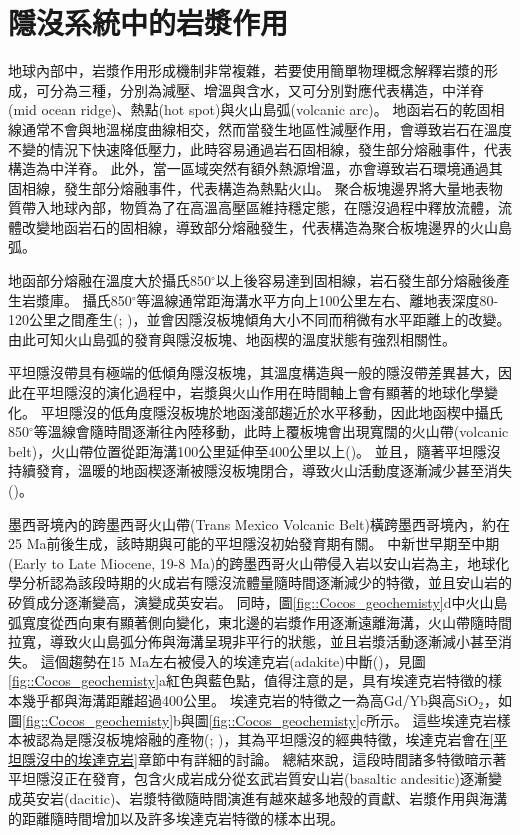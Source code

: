 \section{隱沒系統中的岩漿作用}\label{隱沒系統中的岩漿作用}
地球內部中，岩漿作用形成機制非常複雜，若要使用簡單物理概念解釋岩漿的形成，可分為三種，分別為減壓、增溫與含水，又可分別對應代表構造，中洋脊(mid ocean ridge)、熱點(hot spot)與火山島弧(volcanic arc)。
地函岩石的乾固相線通常不會與地溫梯度曲線相交，然而當發生地區性減壓作用，會導致岩石在溫度不變的情況下快速降低壓力，此時容易通過岩石固相線，發生部分熔融事件，代表構造為中洋脊。
此外，當一區域突然有額外熱源增溫，亦會導致岩石環境通過其固相線，發生部分熔融事件，代表構造為熱點火山。
聚合板塊邊界將大量地表物質帶入地球內部，物質為了在高溫高壓區維持穩定態，在隱沒過程中釋放流體，流體改變地函岩石的固相線，導致部分熔融發生，代表構造為聚合板塊邊界的火山島弧。

地函部分熔融在溫度大於攝氏850$^{\circ}$以上後容易達到固相線，岩石發生部分熔融後產生岩漿庫。
攝氏850$^{\circ}$等溫線通常距海溝水平方向上100公里左右、離地表深度80-120公里之間產生(\citealp{peacock1990fluid}; \citealp{hyndman2003serpentinization})，並會因隱沒板塊傾角大小不同而稍微有水平距離上的改變。
由此可知火山島弧的發育與隱沒板塊、地函楔的溫度狀態有強烈相關性。

平坦隱沒帶具有極端的低傾角隱沒板塊，其溫度構造與一般的隱沒帶差異甚大，因此在平坦隱沒的演化過程中，岩漿與火山作用在時間軸上會有顯著的地球化學變化。
平坦隱沒的低角度隱沒板塊於地函淺部趨近於水平移動，因此地函楔中攝氏850$^{\circ}$等溫線會隨時間逐漸往內陸移動，此時上覆板塊會出現寬闊的火山帶(volcanic belt)，火山帶位置從距海溝100公里延伸至400公里以上(\citealp{Gutscher2000A})。
並且，隨著平坦隱沒持續發育，溫暖的地函楔逐漸被隱沒板塊閉合，導致火山活動度逐漸減少甚至消失(\citealp{Gutscher2000Bcan})。

墨西哥境內的跨墨西哥火山帶(Trans Mexico Volcanic Belt)橫跨墨西哥境內，約在25 Ma前後生成，該時期與可能的平坦隱沒初始發育期有關。
中新世早期至中期(Early to Late Miocene, 19-8 Ma)的跨墨西哥火山帶侵入岩以安山岩為主，地球化學分析認為該段時期的火成岩有隱沒流體量隨時間逐漸減少的特徵，並且安山岩的矽質成分逐漸變高，演變成英安岩。
同時，圖\ref{fig::Cocos_geochemisty}d中火山島弧寬度從西向東有顯著側向變化，東北邊的岩漿作用逐漸遠離海溝，火山帶隨時間拉寬，導致火山島弧分佈與海溝呈現非平行的狀態，並且岩漿活動逐漸減小甚至消失。
這個趨勢在15 Ma左右被侵入的埃達克岩(adakite)中斷(\citealp{mori2007effects})，見圖\ref{fig::Cocos_geochemisty}a紅色與藍色點，值得注意的是，具有埃達克岩特徵的樣本幾乎都與海溝距離超過400公里。
埃達克岩的特徵之一為高Gd/Yb與高SiO$_2$，如圖\ref{fig::Cocos_geochemisty}b與圖\ref{fig::Cocos_geochemisty}c所示。
這些埃達克岩樣本被認為是隱沒板塊熔融的產物(\citealp{gomez2003temporal}; \citealp{mori2007effects})，其為平坦隱沒的經典特徵，埃達克岩會在\ref{平坦隱沒中的埃達克岩}章節中有詳細的討論。
總結來說，這段時間諸多特徵暗示著平坦隱沒正在發育，包含火成岩成分從玄武岩質安山岩(basaltic andesitic)逐漸變成英安岩(dacitic)、岩漿特徵隨時間演進有越來越多地殼的貢獻、岩漿作用與海溝的距離隨時間增加以及許多埃達克岩特徵的樣本出現。

